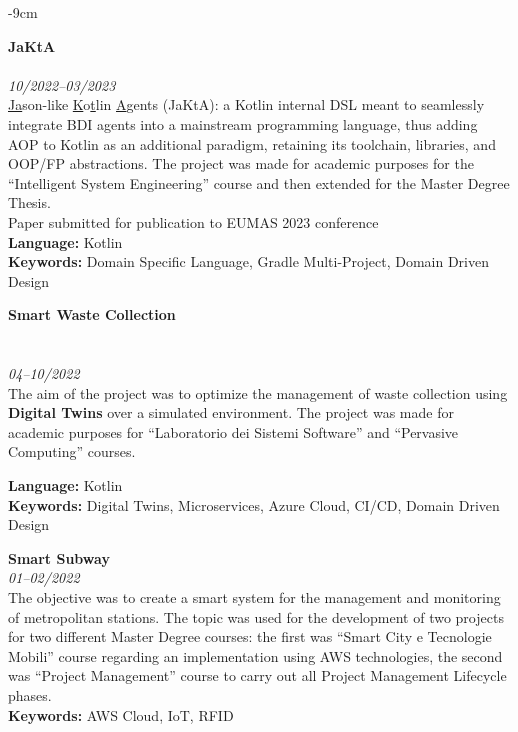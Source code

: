 \documentclass[10pt,a4paper]{altacv}
\begin{document}
\begin{adjustwidth}{}{-9cm}

    \textbf{JaKtA}\\
    \\
    \textit{10/2022--03/2023}\\ \smallskip
    \underline{Ja}son-like \underline{K}o\underline{t}lin \underline{A}gents (JaKtA): a Kotlin internal DSL meant to seamlessly integrate BDI agents into a mainstream programming language, thus adding AOP to Kotlin as an additional paradigm, retaining its toolchain, libraries, and OOP/FP abstractions. The project was made for academic purposes for the ``Intelligent System Engineering'' course and then extended for the Master Degree Thesis.\\ \smallskip
    {\small \notesymbol \hspace{0.5em} Paper submitted for publication to EUMAS 2023 conference}\\
    \smallskip
    \textbf{Language:} Kotlin\\
    \textbf{Keywords:} Domain Specific Language, Gradle Multi-Project, Domain Driven Design

    \divider

    \clearpage

    \textbf{Smart Waste Collection}\\
    \\
    \\
    \textit{04--10/2022}\\ \smallskip
    The aim of the project was to optimize the management of waste collection using \textbf{Digital Twins} over a simulated environment.
    The project was made for academic purposes for ``Laboratorio dei Sistemi Software'' and ``Pervasive Computing'' courses.\\
    \smallskip

    \textbf{Language:} Kotlin\\
    \textbf{Keywords:} Digital Twins, Microservices, Azure Cloud, CI/CD, Domain Driven Design

    \divider

    \textbf{Smart Subway}\\
    \textit{01--02/2022}\\ \smallskip
    The objective was to create a smart system for the management and monitoring of metropolitan stations.
    The topic was used for the development of two projects for two different Master Degree courses: the first was ``Smart City e Tecnologie Mobili'' course regarding an implementation using AWS technologies,
    the second was ``Project Management'' course to carry out all Project Management Lifecycle phases.\\ \smallskip
    \textbf{Keywords:} AWS Cloud, IoT, RFID


\end{adjustwidth}
\end{document}
